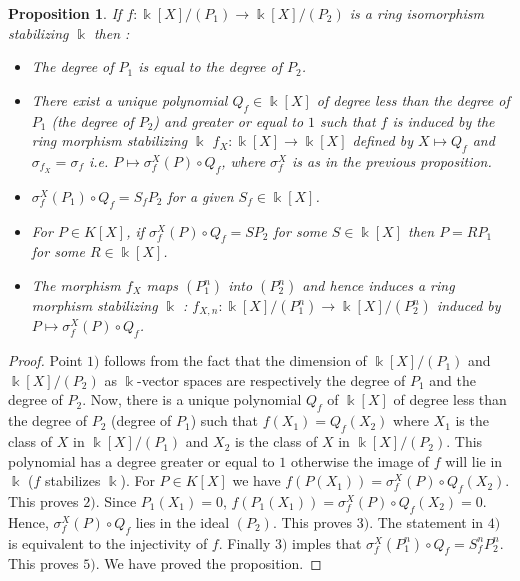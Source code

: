 \documentclass[12pt, reqno]{amsart}
\newtheorem{proposition}[theorem]{Proposition}
\newcommand{\K}{ {\Bbbk} }
\newcommand{\KP}{{\Bbbk[X]/(P_1)}}
\newcommand{\KPP}{{\Bbbk[X]/(P_2)}}
\newcommand{\KPn}{{\Bbbk[X]/(P_1^n)}}
\newcommand{\KPPn}{{\Bbbk[X]/(P_2^n)}}
\begin{document}
\begin{proposition}\label{P1}
If $f: \KP\to \KPP$ is a ring isomorphism stabilizing $\K$ then :
\begin{itemize}
\item[1)] The degree of $P_1$ is equal to the degree of $P_2$.
\item[2)] There exist a unique polynomial $Q_f\in \K[X]$ of degree less than the degree of $P_1$ (the degree of $P_2$) and greater or equal to $1$ such that $f$ is induced by the ring morphism stabilizing $\K$ $f_X: \K[X]\to \K[X]$ defined by $X\mapsto Q_f  $ and $\sigma_{f_X}=\sigma_f$ i.e. $P\mapsto \sigma_{f}^X(P)\circ Q_f$, where $\sigma_f^X$ is as in the previous proposition.
\item[3)] $\sigma_f^X(P_1)\circ Q_f=S_fP_2$ for a given $S_f \in \K[X]$.
\item[4)] For $P\in K[X]$, if $\sigma_f^X(P)\circ Q_f= SP_2$ for some $S\in \K[X]$ then $P=RP_1$ for some $R\in \K[X]$.  
\item[5)] The morphism $f_X$ maps $(P_1^n)$ into $(P_2^n)$ and hence induces a ring morphism stabilizing $\K$ :  $f_{X,n}:\KPn\to \KPPn$ induced by $P\mapsto \sigma_f^X(P)\circ Q_f$.
\end{itemize}
\end{proposition}
\begin{proof}
Point $1)$ follows from the fact that the dimension of $ \KP$ and $\KPP$ as $\K$-vector spaces are respectively the degree of $P_1$ and the degree of $P_2$. Now, there is a unique polynomial $Q_f$ of $\K[X]$ of degree less than the degree of $P_2$ (degree of $P_1$) such that $f(X_1)=Q_f(X_2)$ where $X_1$ is the class of $X$ in $\KP$ and $X_2$ is the class of $X$ in $\KPP$. This polynomial has a degree greater or equal to $1$ otherwise the image of $f$ will lie in $\K$ ($f$ stabilizes $\K$). For $P\in K[X]$ we have $f(P(X_1))=\sigma_f^X(P)\circ Q_f (X_2)$. This proves $2)$. Since $P_1(X_1)=0$, $f(P_1(X_1))=\sigma_f^X(P)\circ Q_f(X_2)=0$. Hence, $\sigma_f^X(P)\circ Q_f$ lies in the ideal $(P_2)$. This proves $3)$. The statement in $4)$ is equivalent to the injectivity of $f$. Finally $3)$ imples that $\sigma_f^X(P_1^n)\circ Q_f=S_f^nP_2^n$. This proves $5)$. We have proved the proposition.
\end{proof}
\end{document}
